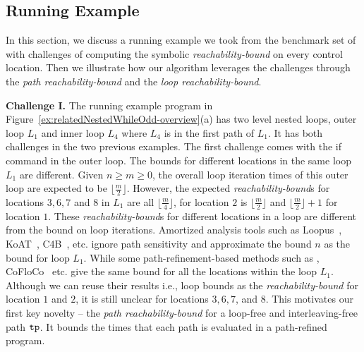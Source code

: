 

\subsection{Running Example}
In this section, we discuss a running example we took from
the benchmark set of~\cite{GulwaniZ10} with
challenges of computing the symbolic
\emph{reachability-bound} on
every control location. Then we illustrate how our algorithm leverages the challenges through the \emph{path reachability-bound} and the \emph{loop reachability-bound}.



\textbf{Challenge I.}
The running example program in Figure~\ref{ex:relatedNestedWhileOdd-overview}(a) has two level nested loops, outer loop $L_1$ and inner loop $L_4$ where $L_4$ is in the first path of $L_1$.
It has both challenges in the two previous examples.
The first challenge comes with the if command in the outer loop.
The bounds for different locations in the same loop $L_1$ are different.
Given $n \geq m \geq 0$,
the overall loop iteration times of this outer loop are expected to be $\lfloor\frac{m}{2}\rfloor$.
However, the expected \emph{reachability-bound}s for locations $3, 6, 7$ and $8$ in $L_1$ are all $\lfloor\frac{m}{4}\rfloor$,
for location $2$ is $\lfloor\frac{m}{2}\rfloor$ and $\lfloor\frac{m}{2}\rfloor + 1$ for location $1$.
These \emph{reachability-bound}s for different locations in a loop are different from the bound on loop iterations.
Amortized analysis tools such as Loopus~\cite{SinnZV17}, KoAT~\cite{BrockschmidtEFFG14,FalkeKS12,FalkeKS11}, C4B~\cite{CarbonneauxHS15}, etc. ignore path sensitivity and approximate the bound $n$ as the bound for loop $L_1$. 
While some path-refinement-based methods such as \cite{GulwaniZ10,GulwaniJK09}, CoFloCo~\cite{Montoya17,Flores-Montoya16,Flores-MontoyaH14} etc. give the same bound for all the locations within the loop $L_1$. 
Although we can reuse their results i.e., loop bounds as the \emph{reachability-bound} for location $1$ and $2$,
it is still unclear for locations $3, 6, 7$, and $8$.
%
This motivates our first key novelty -- the \emph{path reachability-bound}
for a loop-free and interleaving-free path $\mathtt{tp}$.
It bounds the times that each path is evaluated in a path-refined program.


